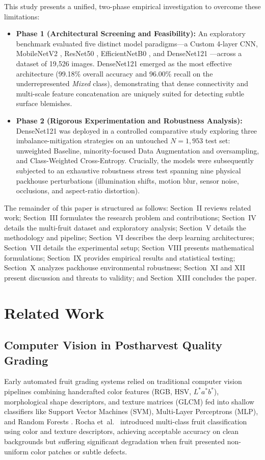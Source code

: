 \documentclass[conference]{IEEEtran}
\begin{document}
This study presents a unified, two-phase empirical investigation to overcome these limitations:
\begin{itemize}
    \item \textbf{Phase 1 (Architectural Screening and Feasibility):} An exploratory benchmark evaluated five distinct model paradigms—a Custom 4-layer CNN, MobileNetV2 \cite{sandler2018mobilenetv2}, ResNet50 \cite{he2016deep}, EfficientNetB0 \cite{tan2019efficientnet}, and DenseNet121 \cite{huang2017densely}—across a dataset of 19,526 images. DenseNet121 emerged as the most effective architecture (99.18\% overall accuracy and 96.00\% recall on the underrepresented \textit{Mixed} class), demonstrating that dense connectivity and multi-scale feature concatenation are uniquely suited for detecting subtle surface blemishes.
    \item \textbf{Phase 2 (Rigorous Experimentation and Robustness Analysis):} DenseNet121 was deployed in a controlled comparative study exploring three imbalance-mitigation strategies on an untouched $N=1,953$ test set: unweighted Baseline, minority-focused Data Augmentation and oversampling, and Class-Weighted Cross-Entropy. Crucially, the models were subsequently subjected to an exhaustive robustness stress test spanning nine physical packhouse perturbations (illumination shifts, motion blur, sensor noise, occlusions, and aspect-ratio distortion).
\end{itemize}

The remainder of this paper is structured as follows: Section~II reviews related work; Section~III formulates the research problem and contributions; Section~IV details the multi-fruit dataset and exploratory analysis; Section~V details the methodology and pipeline; Section~VI describes the deep learning architectures; Section~VII details the experimental setup; Section~VIII presents mathematical formulations; Section~IX provides empirical results and statistical testing; Section~X analyzes packhouse environmental robustness; Section~XI and XII present discussion and threats to validity; and Section~XIII concludes the paper.

\section{Related Work}
\subsection{Computer Vision in Postharvest Quality Grading}
Early automated fruit grading systems relied on traditional computer vision pipelines combining handcrafted color features (RGB, HSV, $L^*a^*b^*$), morphological shape descriptors, and texture matrices (GLCM) fed into shallow classifiers like Support Vector Machines (SVM), Multi-Layer Perceptrons (MLP), and Random Forests \cite{cubero2011review, brosnan2002inspection, kavdir2012apple, bhargava2016fruits}. Rocha et~al.~\cite{rocha2010automatic} introduced multi-class fruit classification using color and texture descriptors, achieving acceptable accuracy on clean backgrounds but suffering significant degradation when fruit presented non-uniform color patches or subtle defects.
\end{document}
